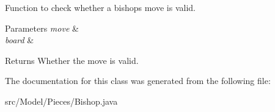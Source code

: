 Function to check whether a bishop\textquotesingle{}s move is valid. 
\begin{DoxyParams}{Parameters}
{\em move} & \\
\hline
{\em board} & \\
\hline
\end{DoxyParams}
\begin{DoxyReturn}{Returns}
Whether the move is valid. 
\end{DoxyReturn}


The documentation for this class was generated from the following file\+:\begin{DoxyCompactItemize}
\item 
src/\+Model/\+Pieces/Bishop.\+java\end{DoxyCompactItemize}
